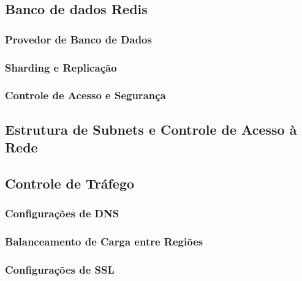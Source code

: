 \subsection{Banco de dados Redis}

\subsubsection{Provedor de Banco de Dados}

\subsubsection{Sharding e Replicação}

\subsubsection{Controle de Acesso e Segurança}

\subsection{Estrutura de Subnets e Controle de Acesso à Rede}

\subsection{Controle de Tráfego}

\subsubsection{Configurações de DNS}

\subsubsection{Balanceamento de Carga entre Regiões}

\subsubsection{Configurações de SSL}

